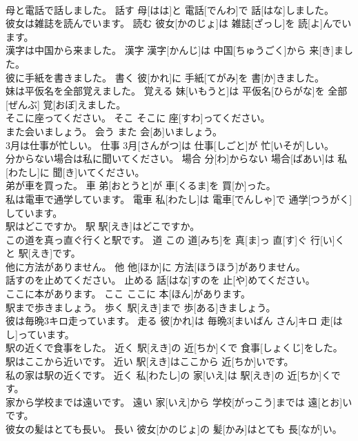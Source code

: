 \documentclass[8pt]{extreport}
\begin{document}
\begin{CJK}{UTF8}{min}
\\	母と電話で話しました。	話す	母[はは]と 電話[でんわ]で 話[はな]しました。	
\\	彼女は雑誌を読んでいます。	読む	彼女[かのじょ]は 雑誌[ざっし]を 読[よ]んでいます。	
\\	漢字は中国から来ました。	漢字	漢字[かんじ]は 中国[ちゅうごく]から 来[き]ました。	
\\	彼に手紙を書きました。	書く	彼[かれ]に 手紙[てがみ]を 書[か]きました。	
\\	妹は平仮名を全部覚えました。	覚える	妹[いもうと]は 平仮名[ひらがな]を 全部[ぜんぶ] 覚[おぼ]えました。	
\\	そこに座ってください。	そこ	そこに 座[すわ]ってください。	
\\	また会いましょう。	会う	また 会[あ]いましょう。	
\\	3月は仕事が忙しい。	仕事	3月[さんがつ]は 仕事[しごと]が 忙[いそが]しい。	
\\	分からない場合は私に聞いてください。	場合	分[わ]からない 場合[ばあい]は 私[わたし]に 聞[き]いてください。	
\\	弟が車を買った。	車	弟[おとうと]が 車[くるま]を 買[か]った。	
\\	私は電車で通学しています。	電車	私[わたし]は 電車[でんしゃ]で 通学[つうがく]しています。	
\\	駅はどこですか。	駅	駅[えき]はどこですか。	
\\	この道を真っ直ぐ行くと駅です。	道	この 道[みち]を 真[ま]っ 直[す]ぐ 行[い]くと 駅[えき]です。	
\\	他に方法がありません。	他	他[ほか]に 方法[ほうほう]がありません。	
\\	話すのを止めてください。	止める	話[はな]すのを 止[や]めてください。	
\\	ここに本があります。	ここ	ここに 本[ほん]があります。	
\\	駅まで歩きましょう。	歩く	駅[えき]まで 歩[ある]きましょう。	
\\	彼は毎晩3キロ走っています。	走る	彼[かれ]は 毎晩3[まいばん さん]キロ 走[はし]っています。	
\\	駅の近くで食事をした。	近く	駅[えき]の 近[ちか]くで 食事[しょくじ]をした。	
\\	駅はここから近いです。	近い	駅[えき]はここから 近[ちか]いです。	
\\	私の家は駅の近くです。	近く	私[わたし]の 家[いえ]は 駅[えき]の 近[ちか]くです。	
\\	家から学校までは遠いです。	遠い	家[いえ]から 学校[がっこう]までは 遠[とお]いです。	
\\	彼女の髪はとても長い。	長い	彼女[かのじょ]の 髪[かみ]はとても 長[なが]い。	

\end{CJK}
\end{document}
